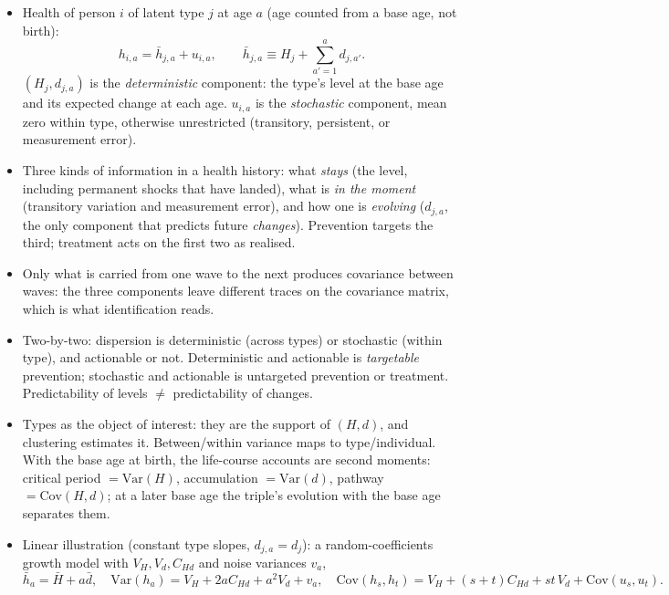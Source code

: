 \documentclass[11pt]{article}
\newcommand{\Var}{\mathrm{Var}}
\newcommand{\Cov}{\mathrm{Cov}}
\begin{document}
\begin{itemize}
\item Health of person $i$ of latent type $j$ at age $a$ (age counted from a base age, not birth):
\begin{equation}
h_{i,a} = \bar h_{j,a} + u_{i,a}, \qquad \bar h_{j,a} \equiv H_j + \sum_{a'=1}^{a} d_{j,a'} .
\label{eq:levels}
\end{equation}
$(H_j, d_{j,a})$ is the \emph{deterministic} component: the type's level at the base age and its expected change at each age. $u_{i,a}$ is the \emph{stochastic} component, mean zero within type, otherwise unrestricted (transitory, persistent, or measurement error).
\item Three kinds of information in a health history: what \emph{stays} (the level, including permanent shocks that have landed), what is \emph{in the moment} (transitory variation and measurement error), and how one is \emph{evolving} ($d_{j,a}$, the only component that predicts future \emph{changes}). Prevention targets the third; treatment acts on the first two as realised.
\item Only what is carried from one wave to the next produces covariance between waves: the three components leave different traces on the covariance matrix, which is what identification reads.
\item Two-by-two: dispersion is deterministic (across types) or stochastic (within type), and actionable or not. Deterministic and actionable is \emph{targetable} prevention; stochastic and actionable is untargeted prevention or treatment. Predictability of levels $\neq$ predictability of changes.
\item Types as the object of interest: they are the support of $(H, d)$, and clustering estimates it. Between/within variance maps to type/individual. With the base age at birth, the life-course accounts are second moments: critical period $=\Var(H)$, accumulation $=\Var(d)$, pathway $=\Cov(H,d)$; at a later base age the triple's evolution with the base age separates them.
\item Linear illustration (constant type slopes, $d_{j,a}=d_j$): a random-coefficients growth model with $V_H, V_d, C_{Hd}$ and noise variances $v_a$,
\begin{equation}
\bar h_a=\bar H+a\bar d,\quad \Var(h_a)=V_H+2aC_{Hd}+a^2V_d+v_a,\quad
\Cov(h_s,h_t)=V_H+(s+t)C_{Hd}+st\,V_d+\Cov(u_s,u_t).
\label{eq:forward}
\end{equation}
\end{itemize}
\end{document}
